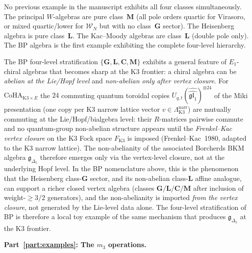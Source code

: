 \begin{computation}[The ordered bar complex of the
Bershadsky--Polyakov algebra
$\mathcal{B}^{k'} = W_{k'}(\mathfrak{sl}_3,f_{\min})$;
\ClaimStatusProvedHere]
\begin{remark}
No previous example in the manuscript exhibits
all four classes simultaneously. The principal $W$-algebras
are pure class~$\mathbf{M}$ (all pole orders quartic
for Virasoro, or mixed quartic/lower for $\mathcal{W}_N$ but
with no class~$\mathbf{G}$ sector). The Heisenberg algebra
is pure class~$\mathbf{L}$. The Kac--Moody algebras are
class~$\mathbf{L}$ (double pole only). The BP algebra is
the first example exhibiting the complete four-level hierarchy.
\end{remark}

\begin{remark}
\label{rem:oackd-front-abelian-lie-nonabelian-vertex}
%
%
%
The BP four-level stratification $\{\mathbf{G}, \mathbf{L},
\mathbf{C}, \mathbf{M}\}$ exhibits a general feature of
$E_1$-chiral algebras that becomes sharp at the K3 frontier:
a chiral algebra can be \emph{abelian at the Lie/Hopf level}
and \emph{non-abelian only after vertex closure}. For
$\mathrm{CoHA}_{\mathrm{K3}\times E}$ the $24$ commuting
quantum toroidal copies $U_{q,t}(\widehat{\widehat{\mathfrak{gl}_1}})^{\otimes 24}$
of the Miki presentation (one copy per K3 narrow lattice
vector $v \in \Lambda_{\mathrm{K3}}^{\mathrm{narr}}$) are
mutually commuting at the Lie/Hopf/bialgebra level: their
$R$-matrices pairwise commute and no quantum-group non-abelian
structure appears until the \emph{Frenkel--Kac vertex
closure} on the K3 Fock space $F_{\mathrm{K3}}$ is imposed
(Frenkel--Kac~1980, adapted to the K3 narrow lattice). The
non-abelianity of the associated Borcherds BKM algebra
$\mathfrak{g}_{\Delta_5}$ therefore emerges only via the
vertex-level closure, not at the underlying Hopf level. In
the BP nomenclature above, this is the phenomenon that the
Heisenberg class-$\mathbf G$ sector, and its non-abelian
class-$\mathbf L$ affine analogue, can support a richer closed vertex algebra (classes
$\mathbf{G/L/C/M}$ after inclusion of weight-$\geq 3/2$
generators), and the non-abelianity is imported \emph{from the
vertex closure}, not generated by the Lie-level data alone.
The four-level stratification of BP is therefore a local
toy example of the same mechanism that produces
$\mathfrak{g}_{\Delta_5}$ at the K3 frontier.
\end{remark}

\medskip
\noindent\textbf{Part~\ref{part:examples}: The $m_3$ operations.}


\end{computation}
